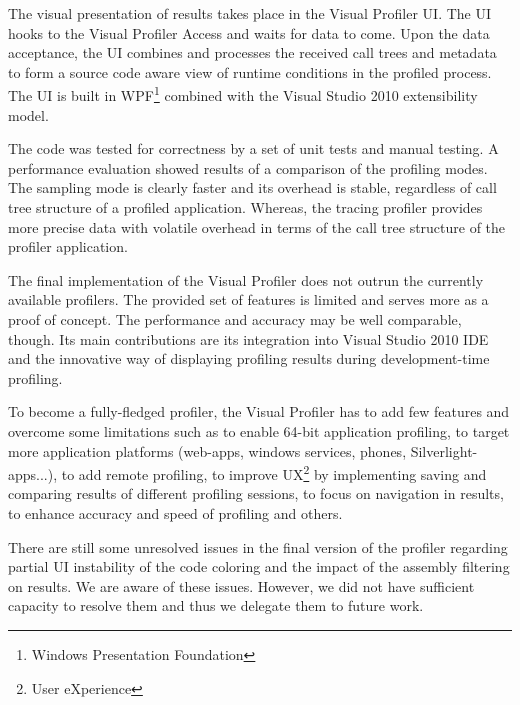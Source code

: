 The visual presentation of results takes place in the Visual Profiler UI. The UI hooks to the Visual Profiler Access and waits for data to come. Upon the data acceptance, the UI combines and processes the received call trees and metadata to form a source code aware view of runtime conditions in the profiled process. The UI is built in WPF\footnote{Windows Presentation Foundation} combined with the Visual Studio 2010 extensibility model. 

The code was tested for correctness by a set of unit tests and manual testing. A performance evaluation showed results of a comparison of the profiling
modes. The sampling mode is clearly faster and its overhead is stable, regardless of call tree structure of a profiled application. Whereas, the tracing profiler provides more precise data with volatile overhead in terms of the call tree structure of the profiler application.

The final implementation of the Visual Profiler does not outrun the currently available profilers. The provided set of features is limited and serves more as a proof of concept. The performance and accuracy may be well comparable, though. Its main contributions are its integration into Visual Studio 2010 IDE and the innovative way of displaying profiling results during development-time profiling.

To become a fully-fledged profiler, the Visual Profiler has to add few features and overcome some limitations such as to
enable 64-bit application profiling,
to target more application platforms (web-apps, windows services, phones, Silverlight-apps...),
to add remote profiling,
to improve UX\footnote{User eXperience} by implementing saving and comparing results of different profiling sessions, to focus on navigation in results,
to enhance accuracy and speed of profiling and others.

There are still some unresolved issues in the final version of the profiler regarding partial UI instability of the code coloring and the impact of the assembly filtering on results. We are aware of these issues. However, we did not have sufficient capacity to resolve them and thus we delegate them to future work.






































